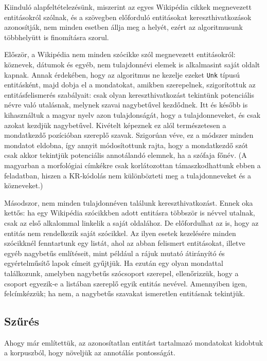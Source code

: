 \documentclass{llncs}
\begin{document}
Kiinduló alapfeltételezésünk, miszerint az egyes Wikipédia cikkek megnevezett entitásokról szólnak, és a szövegben előforduló entitásokat kereszthivatkozások azonosítják, nem minden esetben állja meg a helyét, ezért az algoritmusunk  
többhelyütt is finomításra szorul.

Először, a Wikipédia nem minden szócikke szól megnevezett entitásokról: köznevek, dátumok és egyéb, nem tulajdonnévi elemek is
alkalmasint saját oldalt kapnak. Annak érdekében, hogy az algoritmus ne
kezelje ezeket \texttt{Unk} típusú entitásként, majd dobja el a mondatokat,
amikben szerepelnek, szigorítottuk az entitásfelismerés szabályait: csak olyan
kereszthivatkozást tekintünk potenciális névre való utalásnak, melynek szavai nagybetűvel kezdődnek.
Itt és később is kihasználtuk a magyar nyelv azon tulajdonságát, hogy a
tulajdonneveket, és csak azokat kezdjük nagybetűvel. 
Kivételt képeznek ez alól természetesen a mondatkezdő pozícióban szereplő szavak. Szigorúan véve, ez a módszer minden mondatot eldobna, így annyit módosítottunk rajta, hogy a mondatkezdő szót csak akkor tekintjük potenciális annotálandó elemnek, ha a szófaja főnév.  
(A magyarban a morfológiai címkékre csak korlátozottan támaszkodhattunk ebben a feladatban, hiszen a KR-kódolás nem különbözteti meg a tulajdonneveket és a közneveket.)

Másodszor, nem minden tulajdonnéven találunk
kereszthivatkozást. Ennek oka kettős: ha egy Wikipédia szócikkben adott entitásra
többször is névvel utalnak, csak az első alkalommal linkelik a saját oldalához. De
előfordulhat az is, hogy az entitás nem rendelkezik saját szócikkel. Az ilyen
esetek kezelésére minden szócikknél fenntartunk egy listát, ahol az abban
felismert entitásokat, illetve egyéb nagybetűs említéseit, mint például a rájuk mutató
átirányító és egyértelműsítő lapok címeit gyűjtjük. Ha ezután egy olyan mondattal
találkozunk, amelyben nagybetűs szócsoport szerepel, ellenőrizzük, hogy a csoport
egyezik-e a listában szereplő egyik entitás nevével. Amennyiben igen,
felcímkézzük; ha nem, a nagybetűs szavakat ismeretlen entitásnak tekintjük.

\subsection{Szűrés}

Ahogy már említettük, az azonosítatlan entitást tartalmazó mondatokat kidobtuk a korpuszból, hogy növeljük az annotálás pontosságát. 
\end{document}
